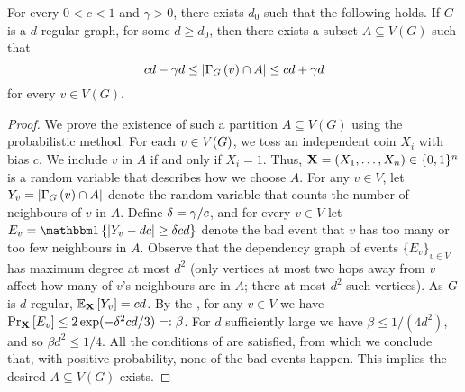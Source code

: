 \documentclass[11pt]{article}
\begin{document}
\begin{lemma} \label{thm:partition}
For every $0 < c < 1$ and $\gamma> 0$, there exists $d_0$ such that the following holds. If $G$ is a $d$-regular graph, for some $d \ge d_0$, then there exists a subset $A \subseteq V(G)$ such that
$$
    cd - \gamma d \leq \left| \Neighbourhood{G}{v} \cap A \right| \leq cd + \gamma d 
$$
for every $v \in V(G)$.
\end{lemma}
\begin{proof}
We prove the existence of such a partition $A \subseteq V(G)$ using the probabilistic method.
For each $v \in \Vertices{\Graph}$, we toss an independent coin $X_i$ with bias $c$.
We include $v$ in $A$ if and only if $X_i = 1$. Thus, $\vec{X} \Def (X_1, \dots, X_n) \in \bit^n$ is a random variable that describes how we choose $A$. For any $v \in V$, let $Y_v \Def |\Neighbourhood{G}{v} \cap \RedA|$ denote the random variable that counts the number of neighbours of $v$ in $A$.
Define $\delta \Def \gamma / c$, and for every $v \in V$ let $E_v = \Indicator{|Y_v - d c | \geq \delta c d}$ denote the bad event that $v$ has too many or too few neighbours in $A$.
Observe that the dependency graph of events $\{ E_v \}_{v \in V}$ has maximum degree at most $d^2$ (only vertices at most two hops away from $v$ affect how many of $v$'s neighbours are in $A$; there at most $d^2$ such vertices).
As $\Graph$ is $d$-regular, $\Mean{\vec{X}}{Y_v} = c d$. By the , for any $v \in V$ we have $\PProb{E_v}{\vec{X}} \leq 2\exp(-\delta^2c d/3) =: \beta$.
For $d$ sufficiently large we have $\beta \leq 1/(4d^2)$, and so $\beta d^2 \leq 1/4$. All the conditions of  are satisfied, from which we conclude that, with positive probability, none of the bad events happen. This implies the desired $A \subseteq V(G)$ exists.
\end{proof}
\end{document}
